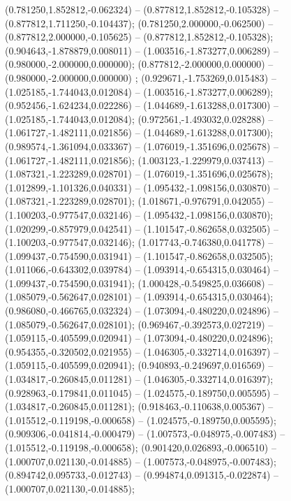  (0.781250,1.852812,-0.062324) -- (0.877812,1.852812,-0.105328) -- (0.877812,1.711250,-0.104437);
 (0.781250,2.000000,-0.062500) -- (0.877812,2.000000,-0.105625) -- (0.877812,1.852812,-0.105328);
 (0.904643,-1.878879,0.008011) -- (1.003516,-1.873277,0.006289) -- (0.980000,-2.000000,0.000000);
 (0.877812,-2.000000,0.000000) -- (0.980000,-2.000000,0.000000) ;
 (0.929671,-1.753269,0.015483) -- (1.025185,-1.744043,0.012084) -- (1.003516,-1.873277,0.006289);
 (0.952456,-1.624234,0.022286) -- (1.044689,-1.613288,0.017300) -- (1.025185,-1.744043,0.012084);
 (0.972561,-1.493032,0.028288) -- (1.061727,-1.482111,0.021856) -- (1.044689,-1.613288,0.017300);
 (0.989574,-1.361094,0.033367) -- (1.076019,-1.351696,0.025678) -- (1.061727,-1.482111,0.021856);
 (1.003123,-1.229979,0.037413) -- (1.087321,-1.223289,0.028701) -- (1.076019,-1.351696,0.025678);
 (1.012899,-1.101326,0.040331) -- (1.095432,-1.098156,0.030870) -- (1.087321,-1.223289,0.028701);
 (1.018671,-0.976791,0.042055) -- (1.100203,-0.977547,0.032146) -- (1.095432,-1.098156,0.030870);
 (1.020299,-0.857979,0.042541) -- (1.101547,-0.862658,0.032505) -- (1.100203,-0.977547,0.032146);
 (1.017743,-0.746380,0.041778) -- (1.099437,-0.754590,0.031941) -- (1.101547,-0.862658,0.032505);
 (1.011066,-0.643302,0.039784) -- (1.093914,-0.654315,0.030464) -- (1.099437,-0.754590,0.031941);
 (1.000428,-0.549825,0.036608) -- (1.085079,-0.562647,0.028101) -- (1.093914,-0.654315,0.030464);
 (0.986080,-0.466765,0.032324) -- (1.073094,-0.480220,0.024896) -- (1.085079,-0.562647,0.028101);
 (0.969467,-0.392573,0.027219) -- (1.059115,-0.405599,0.020941) -- (1.073094,-0.480220,0.024896);
 (0.954355,-0.320502,0.021955) -- (1.046305,-0.332714,0.016397) -- (1.059115,-0.405599,0.020941);
 (0.940893,-0.249697,0.016569) -- (1.034817,-0.260845,0.011281) -- (1.046305,-0.332714,0.016397);
 (0.928963,-0.179841,0.011045) -- (1.024575,-0.189750,0.005595) -- (1.034817,-0.260845,0.011281);
 (0.918463,-0.110638,0.005367) -- (1.015512,-0.119198,-0.000658) -- (1.024575,-0.189750,0.005595);
 (0.909306,-0.041814,-0.000479) -- (1.007573,-0.048975,-0.007483) -- (1.015512,-0.119198,-0.000658);
 (0.901420,0.026893,-0.006510) -- (1.000707,0.021130,-0.014885) -- (1.007573,-0.048975,-0.007483);
 (0.894742,0.095733,-0.012743) -- (0.994874,0.091315,-0.022874) -- (1.000707,0.021130,-0.014885);
